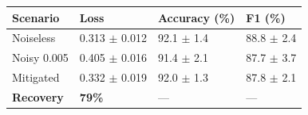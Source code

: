 \begin{tabular}{llll}
\toprule
Scenario & Loss & Accuracy (\%) & F1 (\%) \\
\midrule
Noiseless & 0.313 $\pm$ 0.012 & 92.1 $\pm$ 1.4 & 88.8 $\pm$ 2.4 \\
Noisy 0.005 & 0.405 $\pm$ 0.016 & 91.4 $\pm$ 2.1 & 87.7 $\pm$ 3.7 \\
Mitigated & 0.332 $\pm$ 0.019 & 92.0 $\pm$ 1.3 & 87.8 $\pm$ 2.1 \\
\textbf{Recovery} & \textbf{79\%} & --- & --- \\
\bottomrule
\end{tabular}
